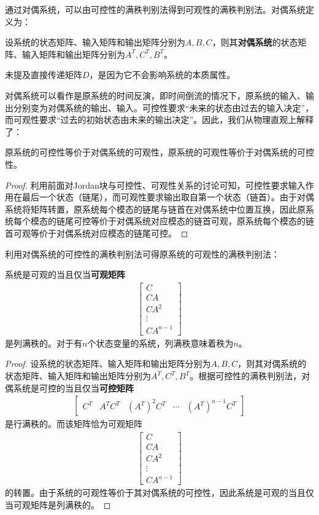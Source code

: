 通过对偶系统，可以由可控性的满秩判别法得到可观性的满秩判别法。对偶系统定义为：
\begin{definition}[对偶系统]
    设系统的状态矩阵、输入矩阵和输出矩阵分别为$A,B,C$，则其\textbf{对偶系统}的状态矩阵、输入矩阵和输出矩阵分别为$A^T,C^T,B^T$。
\end{definition}

未提及直接传递矩阵$D$，是因为它不会影响系统的本质属性。

对偶系统可以看作是原系统的时间反演，即时间倒流的情况下，原系统的输入、输出分别变为对偶系统的输出、输入。可控性要求“未来的状态由过去的输入决定”，而可观性要求“过去的初始状态由未来的输出决定”。因此，我们从物理直观上解释了：

\begin{theorem}
    原系统的可控性等价于对偶系统的可观性，原系统的可观性等价于对偶系统的可控性。
\end{theorem}
\begin{proof}
    利用前面对Jordan块与可控性、可观性关系的讨论可知，可控性要求输入作用在最后一个状态（链尾），而可观性要求输出取自第一个状态（链首）。由于对偶系统将矩阵转置，原系统每个模态的链尾与链首在对偶系统中位置互换，因此原系统每个模态的链尾可控等价于对偶系统对应模态的链首可观，原系统每个模态的链首可观等价于对偶系统对应模态的链尾可控。
\end{proof}

利用对偶系统的可控性的满秩判别法可得原系统的可观性的满秩判别法：

\begin{theorem}[可观性的满秩判别法]
    系统是可观的当且仅当\textbf{可观矩阵}
    \begin{align*}
    \begin{bmatrix}
    C\\
    CA\\
    CA^2\\
    \vdots\\
    CA^{n-1}
    \end{bmatrix}
    \end{align*}
    是列满秩的。对于有$n$个状态变量的系统，列满秩意味着秩为$n$。
\end{theorem}
\begin{proof}
    设系统的状态矩阵、输入矩阵和输出矩阵分别为$A,B,C$，则其对偶系统的状态矩阵、输入矩阵和输出矩阵分别为$A^T,C^T,B^T$。根据可控性的满秩判别法，对偶系统是可控的当且仅当\textbf{可控矩阵}
    \begin{align*}
    \begin{bmatrix}
    C^T & A^TC^T & (A^T)^2C^T & \cdots & (A^T)^{n-1}C^T
    \end{bmatrix}
    \end{align*}
    是行满秩的。而该矩阵恰为可观矩阵\begin{align*}
    \begin{bmatrix}
    C\\
    CA\\
    CA^2\\
    \vdots\\
    CA^{n-1}
    \end{bmatrix}
    \end{align*}
    的转置。由于系统的可观性等价于其对偶系统的可控性，因此系统是可观的当且仅当可观矩阵是列满秩的。
\end{proof}
